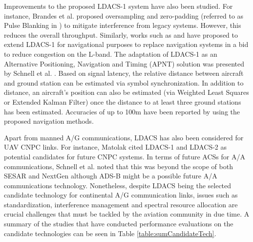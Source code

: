 Improvements to the proposed LDACS-1 system have also been studied. For instance, Brandes et al. \cite{brandes2009physical} proposed oversampling and zero-padding (referred to as Pulse Blanking in \cite{brandes2009physical}) to mitigate interference from legacy systems. However, this reduces the overall throughput. Similarly, works such as \cite{bhaindl2013overview} and \cite{mschnell2014current} have proposed to extend LDACS-1 for navigational purposes to replace navigation systems in a bid to reduce congestion on the L-band. The adaptation of LDACS-1 as an Alternative Positioning, Navigation and Timing (APNT) solution was presented by Schnell et al. \cite{schnell2011using}. Based on signal latency, the relative distance between aircraft and ground station can be estimated via symbol synchronization. In addition to distance, an aircraft's position can also be estimated (via Weighted Least Squares or Extended Kalman Filter) once the distance to at least three ground stations has been estimated. Accuracies of up to 100m have been reported by using the proposed navigation methods. 

Apart from manned A/G communications, LDACS has also been considered for UAV CNPC links. For instance, Matolak \cite{matolak2015unmanned} cited LDACS-1 and LDACS-2 as potential candidates for future CNPC systems. In terms of future ACSs for A/A communications, Schnell et al. \cite{schnell2014ldacs} noted that this was beyond the scope of both SESAR and NextGen although ADS-B might be a possible future A/A communications technology. Nonetheless, despite LDACS being the selected candidate technology for continental A/G communication links, issues such as standardization, interference management and spectral resource allocation are crucial challenges \cite{neji2013survey} that must be tackled by the aviation community in due time. A summary of the studies that have conducted performance evaluations on the candidate technologies can be seen in Table \ref{table:sumCandidateTech}.

